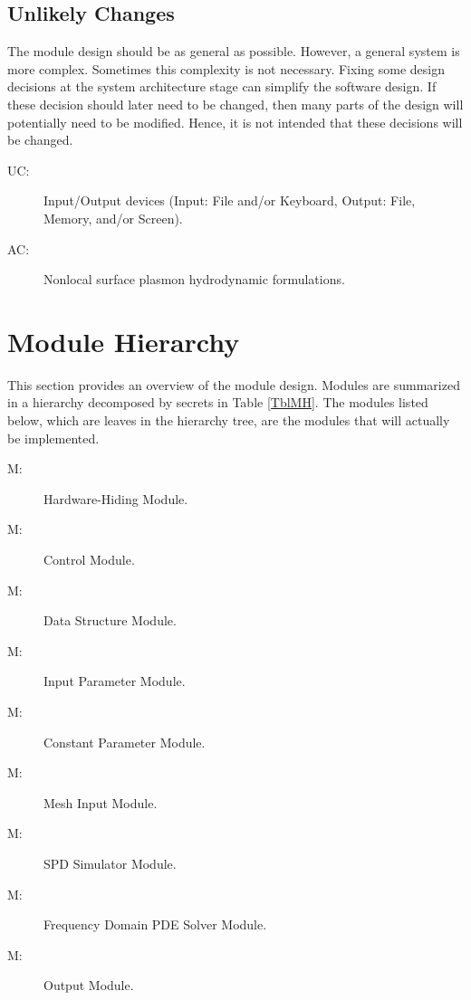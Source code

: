 \documentclass[12pt, titlepage]{article}
\newcounter{acnum} \newcommand{\actheacnum}{AC\theacnum}
\newcounter{ucnum} \newcommand{\uctheucnum}{UC\theucnum}
\newcounter{mnum} \newcommand{\mthemnum}{M\themnum}
\begin{document}
	\subsection{Unlikely Changes} \label{SecUchange}
	
	The module design should be as general as possible. However, a general system is
	more complex. Sometimes this complexity is not necessary. Fixing some design
	decisions at the system architecture stage can simplify the software design. If
	these decision should later need to be changed, then many parts of the design
	will potentially need to be modified. Hence, it is not intended that these
	decisions will be changed.
	
	\begin{description} \item[ \uctheucnum \label{ucIO}:]
		Input/Output devices (Input: File and/or Keyboard, Output: File, Memory, and/or
		Screen). \item[ \actheacnum \label{acForm}:] Nonlocal
		surface plasmon hydrodynamic formulations. \end{description}
	
	
	\section{Module Hierarchy} \label{SecMH}
	
	This section provides an overview of the module design. Modules are summarized
	in a hierarchy decomposed by secrets in Table \ref{TblMH}. The modules listed
	below, which are leaves in the hierarchy tree, are the modules that will
	actually be implemented.
	
	\begin{description} \item [ \mthemnum \label{mHH}:]
		Hardware-Hiding Module.
		
		\item [ \mthemnum \label{mSC}:] \progname{} Control Module.
		
		\item [ \mthemnum \label{mDS}:] Data Structure Module.
		
		\item [ \mthemnum \label{mIP}:] Input Parameter Module.
		
		\item [ \mthemnum \label{mCP}:] Constant Parameter Module.
		
		\item [ \mthemnum \label{mMI}:] Mesh Input Module.
		
		\item [ \mthemnum \label{mSS}:] SPD Simulator Module.
		
		
		\item [ \mthemnum \label{mFD}:] Frequency Domain PDE Solver
		Module.
		
		\item [ \mthemnum \label{mOut}:] Output Module.
		
	\end{description}
	
\end{document}

